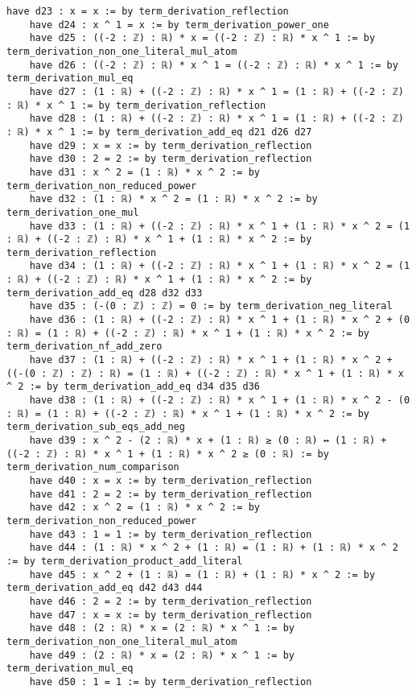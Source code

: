 \documentclass{article}
\begin{document}
\begin{tcolorbox}[colback=white!10, width=\linewidth]
\begin{lstlisting}[language=Lean4]
    have d23 : x = x := by term_derivation_reflection
    have d24 : x ^ 1 = x := by term_derivation_power_one
    have d25 : ((-2 : ℤ) : ℝ) * x = ((-2 : ℤ) : ℝ) * x ^ 1 := by term_derivation_non_one_literal_mul_atom
    have d26 : ((-2 : ℤ) : ℝ) * x ^ 1 = ((-2 : ℤ) : ℝ) * x ^ 1 := by term_derivation_mul_eq
    have d27 : (1 : ℝ) + ((-2 : ℤ) : ℝ) * x ^ 1 = (1 : ℝ) + ((-2 : ℤ) : ℝ) * x ^ 1 := by term_derivation_reflection
    have d28 : (1 : ℝ) + ((-2 : ℤ) : ℝ) * x ^ 1 = (1 : ℝ) + ((-2 : ℤ) : ℝ) * x ^ 1 := by term_derivation_add_eq d21 d26 d27
    have d29 : x = x := by term_derivation_reflection
    have d30 : 2 = 2 := by term_derivation_reflection
    have d31 : x ^ 2 = (1 : ℝ) * x ^ 2 := by term_derivation_non_reduced_power
    have d32 : (1 : ℝ) * x ^ 2 = (1 : ℝ) * x ^ 2 := by term_derivation_one_mul
    have d33 : (1 : ℝ) + ((-2 : ℤ) : ℝ) * x ^ 1 + (1 : ℝ) * x ^ 2 = (1 : ℝ) + ((-2 : ℤ) : ℝ) * x ^ 1 + (1 : ℝ) * x ^ 2 := by term_derivation_reflection
    have d34 : (1 : ℝ) + ((-2 : ℤ) : ℝ) * x ^ 1 + (1 : ℝ) * x ^ 2 = (1 : ℝ) + ((-2 : ℤ) : ℝ) * x ^ 1 + (1 : ℝ) * x ^ 2 := by term_derivation_add_eq d28 d32 d33
    have d35 : (-(0 : ℤ) : ℤ) = 0 := by term_derivation_neg_literal
    have d36 : (1 : ℝ) + ((-2 : ℤ) : ℝ) * x ^ 1 + (1 : ℝ) * x ^ 2 + (0 : ℝ) = (1 : ℝ) + ((-2 : ℤ) : ℝ) * x ^ 1 + (1 : ℝ) * x ^ 2 := by term_derivation_nf_add_zero
    have d37 : (1 : ℝ) + ((-2 : ℤ) : ℝ) * x ^ 1 + (1 : ℝ) * x ^ 2 + ((-(0 : ℤ) : ℤ) : ℝ) = (1 : ℝ) + ((-2 : ℤ) : ℝ) * x ^ 1 + (1 : ℝ) * x ^ 2 := by term_derivation_add_eq d34 d35 d36
    have d38 : (1 : ℝ) + ((-2 : ℤ) : ℝ) * x ^ 1 + (1 : ℝ) * x ^ 2 - (0 : ℝ) = (1 : ℝ) + ((-2 : ℤ) : ℝ) * x ^ 1 + (1 : ℝ) * x ^ 2 := by term_derivation_sub_eqs_add_neg
    have d39 : x ^ 2 - (2 : ℝ) * x + (1 : ℝ) ≥ (0 : ℝ) ↔ (1 : ℝ) + ((-2 : ℤ) : ℝ) * x ^ 1 + (1 : ℝ) * x ^ 2 ≥ (0 : ℝ) := by term_derivation_num_comparison
    have d40 : x = x := by term_derivation_reflection
    have d41 : 2 = 2 := by term_derivation_reflection
    have d42 : x ^ 2 = (1 : ℝ) * x ^ 2 := by term_derivation_non_reduced_power
    have d43 : 1 = 1 := by term_derivation_reflection
    have d44 : (1 : ℝ) * x ^ 2 + (1 : ℝ) = (1 : ℝ) + (1 : ℝ) * x ^ 2 := by term_derivation_product_add_literal
    have d45 : x ^ 2 + (1 : ℝ) = (1 : ℝ) + (1 : ℝ) * x ^ 2 := by term_derivation_add_eq d42 d43 d44
    have d46 : 2 = 2 := by term_derivation_reflection
    have d47 : x = x := by term_derivation_reflection
    have d48 : (2 : ℝ) * x = (2 : ℝ) * x ^ 1 := by term_derivation_non_one_literal_mul_atom
    have d49 : (2 : ℝ) * x = (2 : ℝ) * x ^ 1 := by term_derivation_mul_eq
    have d50 : 1 = 1 := by term_derivation_reflection

\end{lstlisting}
\end{tcolorbox}
\end{document}
